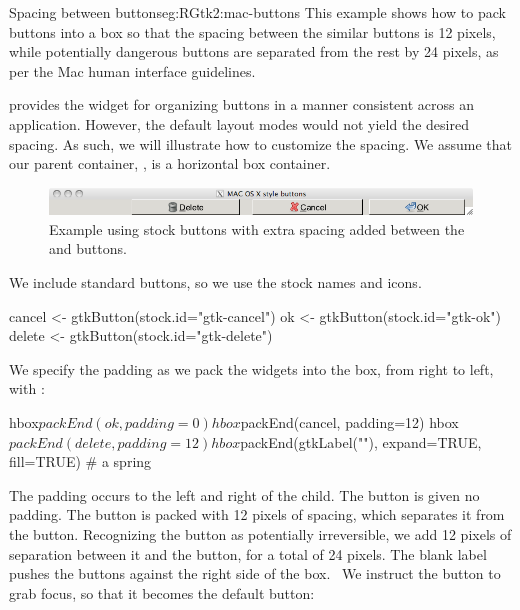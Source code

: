 \begin{example}{Spacing between buttons}{eg:RGtk2:mac-buttons}
This example shows how to pack buttons into a box so that the spacing
between the similar buttons is 12 pixels, while potentially dangerous
buttons are separated from the rest by 24 pixels, as per the Mac human
interface guidelines.  

\GTK\/ provides the widget  for organizing
buttons in a manner consistent across an application. However, the
default layout modes would not yield the desired spacing. As such, we
will illustrate how to customize the spacing.  We assume that our
parent container, , is a horizontal box container.


\begin{figure}
  \centering
  \includegraphics[width=.85\textwidth]{ex-RGtk2-mac-buttons}
  \caption{Example using stock buttons with extra spacing added between the  and  buttons.}
  \label{fig:ex-RGtk2-mac-buttons}
\end{figure}

We include standard buttons, so we use the stock names and icons.
\begin{Schunk}
\begin{Sinput}
 cancel <- gtkButton(stock.id="gtk-cancel")
 ok <- gtkButton(stock.id="gtk-ok")
 delete <- gtkButton(stock.id="gtk-delete")
\end{Sinput}
\end{Schunk}

We specify the padding as we pack the widgets into the box, from right
to left, with :
\begin{Schunk}
\begin{Sinput}
 hbox$packEnd(ok, padding=0)
 hbox$packEnd(cancel, padding=12)
 hbox$packEnd(delete, padding=12)
 hbox$packEnd(gtkLabel(""), expand=TRUE, fill=TRUE) # a spring
\end{Sinput}
\end{Schunk}
%
The padding occurs to the left and right of the child.  The 
button is given no padding. The  button is packed with 12
pixels of spacing, which separates it from the 
button. Recognizing the  button as potentially
irreversible, we add 12 pixels of separation between it and the
 button, for a total of 24 pixels. The blank label pushes
the buttons against the right side of the box.~  We instruct the
 button to grab focus, so that it becomes the default
button:
\begin{Schunk}
\end{Schunk}






\end{example}

